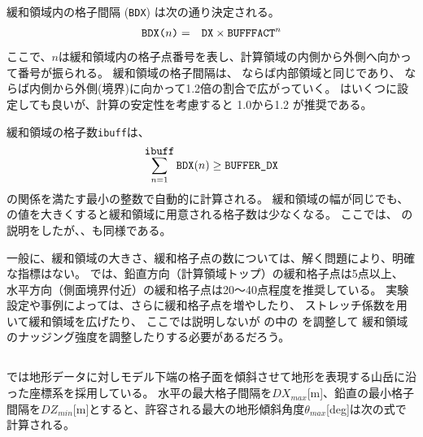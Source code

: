 緩和領域内の格子間隔 (\verb|BDX|) は次の通り決定される。
\begin{eqnarray}
 \verb|BDX(|n\verb|)| &=& \verb|DX| \times \verb|BUFFFACT|^n \nonumber
\end{eqnarray}
ここで、$n$は緩和領域内の格子点番号を表し、計算領域の内側から外側へ向かって番号が振られる。
緩和領域の格子間隔は、
ならば内部領域と同じであり、
ならば内側から外側(境界)に向かって1.2倍の割合で広がっていく。
はいくつに設定しても良いが、計算の安定性を考慮すると 1.0から1.2 が推奨である。

緩和領域の格子数\verb|ibuff|は、
\begin{eqnarray}
\sum_{n=1}^{\verb|ibuff|} \verb|BDX|(n) \ge \verb|BUFFER_DX| \nonumber
\end{eqnarray}
の関係を満たす最小の整数で自動的に計算される。
%
緩和領域の幅が同じでも、
の値を大きくすると緩和領域に用意される格子数は少なくなる。
ここでは、{\XDIR} の説明をしたが、{\YDIR}、{\ZDIR}も同様である。



一般に、緩和領域の大きさ、緩和格子点の数については、解く問題により、明確な指標はない。
\scalerm では、鉛直方向（計算領域トップ）の緩和格子点は5点以上、
水平方向（側面境界付近）の緩和格子点は20〜40点程度を推奨している。
実験設定や事例によっては、さらに緩和格子点を増やしたり、
ストレッチ係数を用いて緩和領域を広げたり、
ここでは説明しないが
の中の
を調整して
緩和領域のナッジング強度を調整したりする必要があるだろう。




\subsection{\SecBasicTopoSetting} \label{subsec:basic_usel_topo}

\scalerm では地形データに対しモデル下端の格子面を傾斜させて地形を表現する山岳に沿った座標系を採用している。
水平の最大格子間隔を$DX_{max}$[m]、鉛直の最小格子間隔を$DZ_{min}$[m]とすると、許容される最大の地形傾斜角度$\theta_{max}$[deg]は次の式で計算される。

